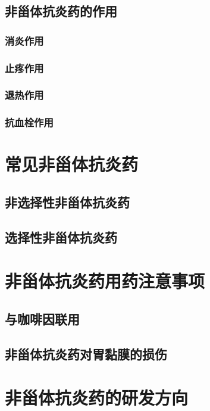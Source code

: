 \documentclass[12pt, a4paper, oneside]{ctexart}
\begin{document}
\subsection{非甾体抗炎药的作用}
\subsubsection{消炎作用}

\subsubsection{止疼作用}

\subsubsection{退热作用}

\subsubsection{抗血栓作用}



\newpage
\section{常见非甾体抗炎药}
\subsection{非选择性非甾体抗炎药}

\subsection{选择性非甾体抗炎药}


\newpage
\section{非甾体抗炎药用药注意事项}
\subsection{与咖啡因联用}

\subsection{非甾体抗炎药对胃黏膜的损伤}


\newpage
\section{非甾体抗炎药的研发方向}
\end{document}
